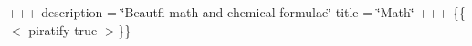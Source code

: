 +++ description = \char`\"{}\+Beaut\textquotesingle{}fl math and chemical formulae\char`\"{} title = \char`\"{}\+Math\char`\"{} +++ \{\{$<$ piratify true $>$\}\} 